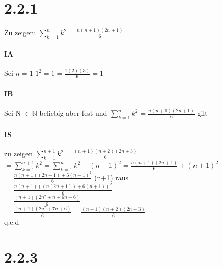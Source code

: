 \documentclass{article}
\begin{document}
\section*{2.2.1}
Zu zeigen:
$\sum\limits_{k=1}^n k^2 = \frac{n(n+1)(2n+1)}{6}$
\paragraph{IA}
Sei $n=1$ $1^2 = 1 = \frac{1(2)(3)}{6}=1$
\paragraph{IB}
Sei N $\in \mathbb{N}$ beliebig aber fest und $\sum\limits_{k=1}^n k^2 = \frac{n(n+1)(2n+1)}{6}$ gilt
\paragraph{IS}
zu zeigen $\sum\limits_{k=1}^{n+1} k^2 = \frac{(n+1)(n+2)(2n+3)}{6}$ \\
$= \sum\limits_{k=1}^{n+1} k^2 = \sum\limits_{k=1}^{n} k^2 + (n+1)^2 = \frac{n(n+1)(2n+1)}{6}+(n+1)^2$ \\
$= \frac{n(n+1)(2n+1)+6(n+1)^2}{6} $ \textbar (n+1) raus \\
$= \frac{n(n+1)((n(2n+1))+6(n+1))^2}{6} $ \\
$= \frac{(n+1)(2n^2+n+6n+6)}{6} $ \\
$= \frac{(n+1)(2n^2+7n+6)}{6} = \frac{(n+1)(n+2)(2n+3)}{6} $ \\
q.e.d
\section*{2.2.3}
\end{document}
